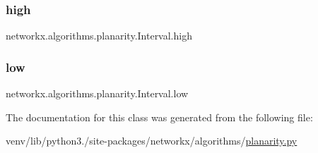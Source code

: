 \subsubsection{\texorpdfstring{high}{high}}
{\footnotesize\ttfamily networkx.\+algorithms.\+planarity.\+Interval.\+high}

\mbox{\label{classnetworkx_1_1algorithms_1_1planarity_1_1Interval_ad430d65011dae14244bc16f134ea8ab8}} 
\subsubsection{\texorpdfstring{low}{low}}
{\footnotesize\ttfamily networkx.\+algorithms.\+planarity.\+Interval.\+low}



The documentation for this class was generated from the following file\+:\begin{DoxyCompactItemize}
\item 
venv/lib/python3./site-\/packages/networkx/algorithms/\hyperlink{planarity_8py}{planarity.\+py}\end{DoxyCompactItemize}
